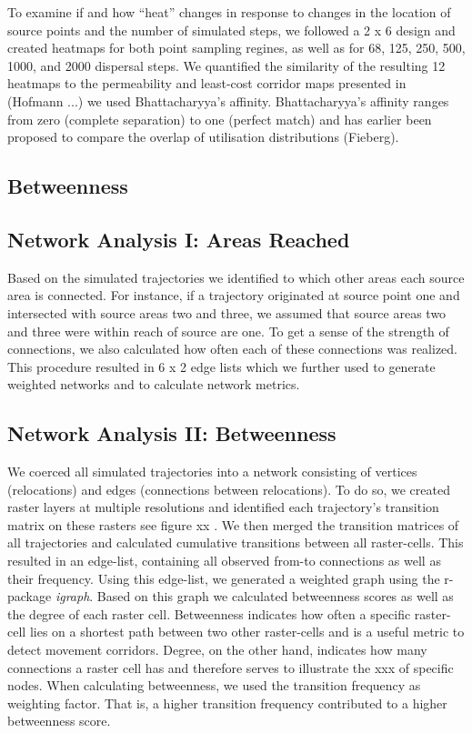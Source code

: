 \documentclass[abstract=on,10pt,a4paper,bibliography=totocnumbered]{article}
\begin{document}
To examine if and how ``heat'' changes in response to changes in the location of
source points and the number of simulated steps, we followed a 2 x 6 design and
created heatmaps for both point sampling regines, as well as for 68, 125, 250,
500, 1000, and 2000 dispersal steps. We quantified the similarity of the
resulting 12 heatmaps to the permeability and least-cost corridor maps presented
in (Hofmann ...) we used Bhattacharyya's affinity. Bhattacharyya's affinity
ranges from zero (complete separation) to one (perfect match) and has earlier
been proposed to compare the overlap of utilisation distributions (Fieberg).


\subsection{Betweenness}


\subsection{Network Analysis I: Areas Reached}
Based on the simulated trajectories we identified to which other areas each
source area is connected. For instance, if a trajectory originated at source
point one and intersected with source areas two and three, we assumed that
source areas two and three were within reach of source are one. To get a sense
of the strength of connections, we also calculated how often each of these
connections was realized. This procedure resulted in 6 x 2 edge lists which we
further used to generate weighted networks and to calculate network metrics.

\subsection{Network Analysis II: Betweenness}
We coerced all simulated trajectories into a network consisting of vertices
(relocations) and edges (connections between relocations). To do so, we created
raster layers at multiple resolutions and identified each trajectory's
transition matrix on these rasters see figure xx \citep{BastilleRousseau.2018}.
We then merged the transition matrices of all trajectories and calculated
cumulative transitions between all raster-cells. This resulted in an edge-list,
containing all observed from-to connections as well as their frequency. Using
this edge-list, we generated a weighted graph using the r-package
\textit{igraph}. Based on this graph we calculated betweenness scores as well as
the degree of each raster cell. Betweenness indicates how often a specific
raster-cell lies on a shortest path between two other raster-cells and is a
useful metric to detect movement corridors. Degree, on the other hand, indicates
how many connections a raster cell has and therefore serves to illustrate the
xxx of specific nodes. When calculating betweenness, we used the transition
frequency as weighting factor. That is, a higher transition frequency
contributed to a higher betweenness score.
\end{document}
